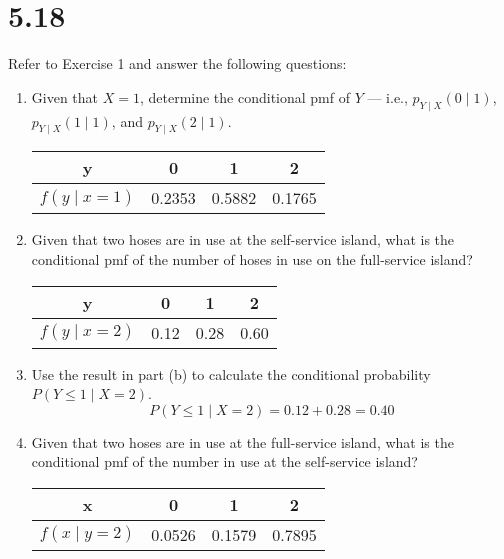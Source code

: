 \documentclass[letterpaper,12pt,fleqn]{article}
\newcommand{\cp}[2]{#1\mathbin{\vert}#2}
\begin{document}
\section*{5.18}

Refer to Exercise 1 and answer the following questions:
\begin{enumerate}[label={\alph*)}]
\item Given that \(X=1\), determine the conditional pmf of \(Y\) --- i.e.,
  \(p_{\cp{Y}{X}}(\cp{0}{1})\), \(p_{\cp{Y}{X}}(\cp{1}{1})\), and \(p_{\cp{Y}{X}}(\cp{2}{1})\).

  \bigskip
  
  \begin{tabular}{c|ccc}
    \hline
    y & 0 & 1 & 2 \\
    \hline
    \(f(\cp{y}{x=1})\) & 0.2353 & 0.5882 & 0.1765 \\
    \hline
  \end{tabular}

  \bigskip

\item Given that two hoses are in use at the self-service island, what is the conditional pmf of the number of hoses in use
  on the full-service island?

  \bigskip
  
  \begin{tabular}{c|ccc}
    \hline
    y & 0 & 1 & 2 \\
    \hline
    \(f(\cp{y}{x=2})\) & 0.12 & 0.28 & 0.60 \\
    \hline
  \end{tabular}

  \bigskip

\item Use the result in part (b) to calculate the conditional probability \(P(\cp{Y\le1}{X=2})\).
  \[P(\cp{Y\le1}{X=2})=0.12+0.28=0.40\]
\item Given that two hoses are in use at the full-service island, what is the conditional pmf of the number in use at the
  self-service island?

  \bigskip
  
  \begin{tabular}{c|ccc}
    \hline
    x & 0 & 1 & 2 \\
    \hline
    \(f(\cp{x}{y=2})\) & 0.0526 & 0.1579 & 0.7895 \\
    \hline
  \end{tabular}
\end{enumerate}
\end{document}
